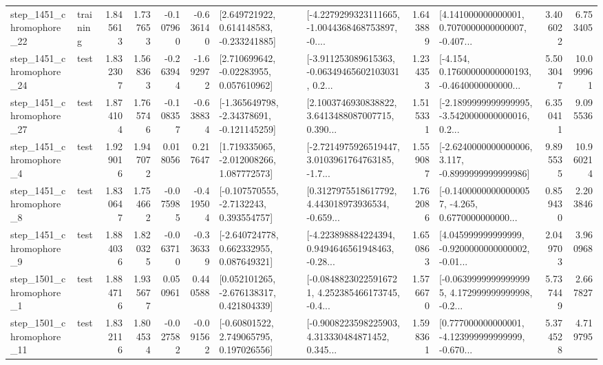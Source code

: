 \begin{tabular}{llrrrrllrlrr}
 step\_1451\_chromophore\_22 &  training &      1.845613 &    1.737653 &     -0.107960 & -0.636140 &    [2.649721922, 0.614148583, -0.233241885] &  [-4.2279299323111665, -1.0044368468753897, -0.... &       1.643889 &  [4.141000000000001, 0.7070000000000007, -0.407... &            3.406022 &          6.753405 \\
 step\_1451\_chromophore\_24 &      test &      1.832307 &    1.568363 &     -0.263944 & -1.692972 &     [2.710699642, -0.02283955, 0.057610962] &  [-3.911253089615363, -0.06349465602103031, 0.2... &       1.234353 &  [-4.154, 0.17600000000000193, -0.4640000000000... &            5.503047 &         10.099961 \\
 step\_1451\_chromophore\_27 &      test &      1.874104 &    1.765746 &     -0.108357 & -0.638834 &   [-1.365649798, -2.34378691, -0.121145259] &  [2.1003746930838822, 3.6413488087007715, 0.390... &       1.515331 &  [-2.1899999999999995, -3.5420000000000016, 0.2... &            6.350411 &          9.095536 \\
  step\_1451\_chromophore\_4 &      test &      1.929016 &    1.947072 &      0.018056 &  0.217647 &    [1.719335065, -2.012008266, 1.087772573] &  [-2.7214975926519447, 3.0103961764763185, -1.7... &       1.559087 &  [-2.6240000000000006, 3.117, -0.8999999999999986] &            9.895535 &         10.960214 \\
  step\_1451\_chromophore\_8 &      test &      1.830647 &    1.754662 &     -0.075985 & -0.419504 &     [-0.107570555, -2.7132243, 0.393554757] &  [0.3127975518617792, 4.443018973936534, -0.659... &       1.762086 &  [-0.14000000000000057, -4.265, 0.6770000000000... &            0.859430 &          2.203846 \\
  step\_1451\_chromophore\_9 &      test &      1.884036 &    1.820325 &     -0.063710 & -0.336339 &    [-2.640724778, 0.662332955, 0.087649321] &  [-4.223898884224394, 0.9494646561948463, -0.28... &       1.650863 &  [4.045999999999999, -0.9200000000000002, -0.01... &            2.049703 &          3.960968 \\
  step\_1501\_chromophore\_1 &      test &      1.884716 &    1.935677 &      0.050961 &  0.440588 &    [0.052101265, -2.676138317, 0.421804339] &  [-0.08488230225916721, 4.252385466173745, -0.4... &       1.576670 &  [-0.06399999999999995, 4.172999999999998, -0.2... &            5.737449 &          2.667827 \\
 step\_1501\_chromophore\_11 &      test &      1.832116 &    1.804534 &     -0.027582 & -0.091562 &     [-0.60801522, 2.749065795, 0.197026556] &  [-0.9008223598225903, 4.313330484871452, 0.345... &       1.598361 &  [0.777000000000001, -4.123999999999999, -0.670... &            5.374528 &          4.719795 \\

\end{tabular}
